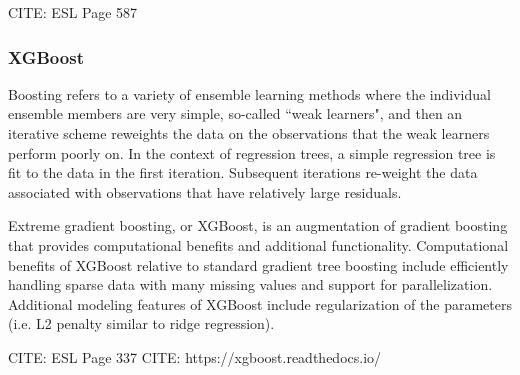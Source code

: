 CITE: ESL Page 587

\subsubsection*{XGBoost}

Boosting refers to a variety of ensemble learning methods where the individual ensemble members are very simple, so-called ``weak learners", and then an iterative scheme reweights the data on the observations that the weak learners perform poorly on. In the context of regression trees, a simple regression tree is fit to the data in the first iteration. Subsequent iterations re-weight the data associated with observations that have relatively large residuals. 

Extreme gradient boosting, or XGBoost, is an augmentation of gradient boosting that provides computational benefits and additional functionality. Computational benefits of XGBoost relative to standard gradient tree boosting include efficiently handling sparse data with many missing values and support for parallelization. Additional modeling features of XGBoost include regularization of the parameters (i.e. L2 penalty similar to ridge regression).

CITE: ESL Page 337
CITE: https://xgboost.readthedocs.io/


